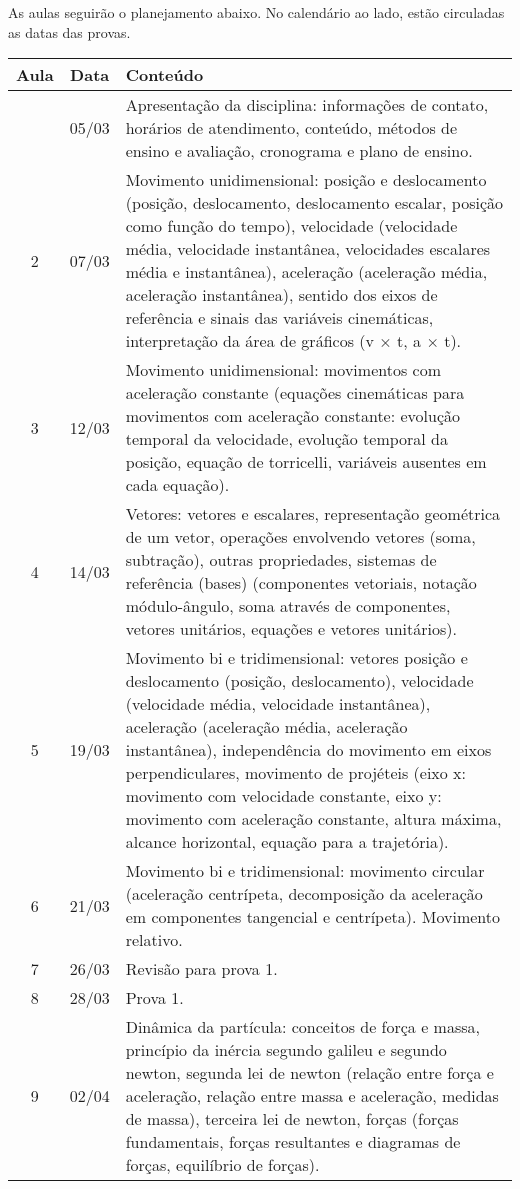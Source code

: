 As aulas seguirão o planejamento abaixo. No calendário ao lado, estão circuladas as datas das provas.
\begin{center}
\begin{longtable}{ccp{70mm}}
\toprule
Aula & Data & Conteúdo \\
\midrule
\endhead
\bottomrule
\endfoot
1 & 05/03 & Apresentação da disciplina: informações de contato, horários de atendimento, conteúdo, métodos de ensino e avaliação, cronograma e plano de ensino. \\
2 & 07/03 & Movimento unidimensional: posição e deslocamento (posição, deslocamento, deslocamento escalar, posição como função do tempo), velocidade (velocidade média, velocidade instantânea, velocidades escalares média e instantânea), aceleração (aceleração média, aceleração instantânea), sentido dos eixos de referência e sinais das variáveis cinemáticas, interpretação da área de gráficos (v × t, a × t). \\
3 & 12/03 & Movimento unidimensional: movimentos com aceleração constante (equações cinemáticas para movimentos com aceleração constante: evolução temporal da velocidade, evolução temporal da posição, equação de torricelli, variáveis ausentes em cada equação). \\
4 & 14/03 & Vetores: vetores e escalares, representação geométrica de um vetor, operações envolvendo vetores (soma, subtração), outras propriedades, sistemas de referência (bases) (componentes vetoriais, notação módulo-ângulo, soma através de componentes, vetores unitários, equações e vetores unitários). \\
5 & 19/03 & Movimento bi e tridimensional: vetores posição e deslocamento (posição, deslocamento), velocidade (velocidade média, velocidade instantânea), aceleração (aceleração média, aceleração instantânea), independência do movimento em eixos perpendiculares, movimento de projéteis (eixo x: movimento com velocidade constante, eixo y: movimento com aceleração constante, altura máxima, alcance horizontal, equação para a trajetória). \\
6 & 21/03 & Movimento bi e tridimensional: movimento circular (aceleração centrípeta, decomposição da aceleração em componentes tangencial e centrípeta). Movimento relativo. \\
7 & 26/03 & Revisão para prova 1. \\
8 & 28/03 & Prova 1. \\
9 & 02/04 & Dinâmica da partícula: conceitos de força e massa, princípio da inércia segundo galileu e segundo newton, segunda lei de newton (relação entre força e aceleração, relação entre massa e aceleração, medidas de massa), terceira lei de newton, forças (forças fundamentais, forças resultantes e diagramas de forças, equilíbrio de forças). \\

\end{longtable}
\end{center}

